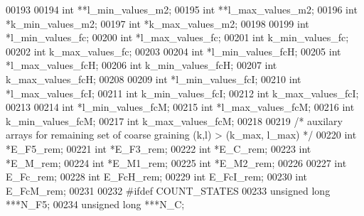 \begin{DoxyCode}
00193 
00194   \textcolor{keywordtype}{int}                   **l\_min\_values\_m2;
00195   \textcolor{keywordtype}{int}                   **l\_max\_values\_m2;
00196   \textcolor{keywordtype}{int}                   *k\_min\_values\_m2;
00197   \textcolor{keywordtype}{int}                   *k\_max\_values\_m2;
00198 
00199   \textcolor{keywordtype}{int}                   *l\_min\_values\_fc;
00200   \textcolor{keywordtype}{int}                   *l\_max\_values\_fc;
00201   \textcolor{keywordtype}{int}                   k\_min\_values\_fc;
00202   \textcolor{keywordtype}{int}                   k\_max\_values\_fc;
00203 
00204   \textcolor{keywordtype}{int}                   *l\_min\_values\_fcH;
00205   \textcolor{keywordtype}{int}                   *l\_max\_values\_fcH;
00206   \textcolor{keywordtype}{int}                   k\_min\_values\_fcH;
00207   \textcolor{keywordtype}{int}                   k\_max\_values\_fcH;
00208 
00209   \textcolor{keywordtype}{int}                   *l\_min\_values\_fcI;
00210   \textcolor{keywordtype}{int}                   *l\_max\_values\_fcI;
00211   \textcolor{keywordtype}{int}                   k\_min\_values\_fcI;
00212   \textcolor{keywordtype}{int}                   k\_max\_values\_fcI;
00213 
00214   \textcolor{keywordtype}{int}                   *l\_min\_values\_fcM;
00215   \textcolor{keywordtype}{int}                   *l\_max\_values\_fcM;
00216   \textcolor{keywordtype}{int}                   k\_min\_values\_fcM;
00217   \textcolor{keywordtype}{int}                   k\_max\_values\_fcM;
00218 
00219   \textcolor{comment}{/* auxilary arrays for remaining set of coarse graining (k,l) > (k\_max, l\_max) */}
00220   \textcolor{keywordtype}{int}                   *E\_F5\_rem;
00221   \textcolor{keywordtype}{int}                   *E\_F3\_rem;
00222   \textcolor{keywordtype}{int}                   *E\_C\_rem;
00223   \textcolor{keywordtype}{int}                   *E\_M\_rem;
00224   \textcolor{keywordtype}{int}                   *E\_M1\_rem;
00225   \textcolor{keywordtype}{int}                   *E\_M2\_rem;
00226 
00227   \textcolor{keywordtype}{int}                   E\_Fc\_rem;
00228   \textcolor{keywordtype}{int}                   E\_FcH\_rem;
00229   \textcolor{keywordtype}{int}                   E\_FcI\_rem;
00230   \textcolor{keywordtype}{int}                   E\_FcM\_rem;
00231 
00232 \textcolor{preprocessor}{#ifdef COUNT\_STATES}
00233   \textcolor{keywordtype}{unsigned} \textcolor{keywordtype}{long}         ***N\_F5;
00234   \textcolor{keywordtype}{unsigned} \textcolor{keywordtype}{long}         ***N\_C;

\end{DoxyCode}
